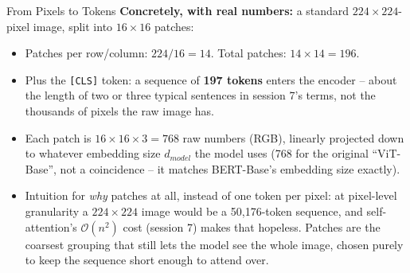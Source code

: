 \begin{vbframe}{From Pixels to Tokens}
\textbf{Concretely, with real numbers:} a standard $224\times224$-pixel image, split into $16\times16$ patches:
\begin{itemize}
  \item Patches per row/column: $224 / 16 = 14$. Total patches: $14\times14 = 196$.
  \item Plus the {\tt [CLS]} token: a sequence of \textbf{197 tokens} enters the encoder -- about the length of two or three typical sentences in session 7's terms, not the thousands of pixels the raw image has.
  \item Each patch is $16\times16\times3 = 768$ raw numbers (RGB), linearly projected down to whatever embedding size $d_{model}$ the model uses (768 for the original ``ViT-Base'', not a coincidence -- it matches BERT-Base's embedding size exactly).
  \item Intuition for \emph{why} patches at all, instead of one token per pixel: at pixel-level granularity a $224\times224$ image would be a 50{,}176-token sequence, and self-attention's $\mathcal{O}(n^2)$ cost (session 7) makes that hopeless. Patches are the coarsest grouping that still lets the model see the whole image, chosen purely to keep the sequence short enough to attend over.
\end{itemize}
\end{vbframe}

